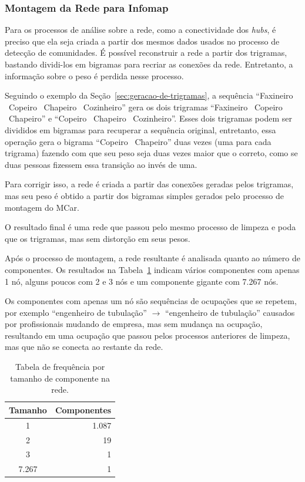 \documentclass[12pt,a4paper]{article}
\begin{document}
\subsubsection{Montagem da Rede para Infomap} \label{sec:montagem-da-rede}

Para os processos de análise sobre a rede, como a conectividade dos \textit{hubs}, é preciso que ela seja criada a partir dos mesmos dados usados no processo de detecção de comunidades. É possível reconstruir a rede a partir dos trigramas, bastando dividi-los em bigramas para recriar as conexões da rede. Entretanto, a informação sobre o peso é perdida nesse processo.

Seguindo o exemplo da Seção~\ref{sec:geracao-de-trigramas}, a sequência \enquote{Faxineiro \textrightarrow~Copeiro \textrightarrow~Chapeiro \textrightarrow~Cozinheiro} gera os dois trigramas \enquote{Faxineiro \textrightarrow~Copeiro \textrightarrow~Chapeiro} e \enquote{Copeiro \textrightarrow~Chapeiro \textrightarrow~Cozinheiro}. Esses dois trigramas podem ser divididos em bigramas para recuperar a sequência original, entretanto, essa operação gera o bigrama \enquote{Copeiro \textrightarrow~Chapeiro} duas vezes (uma para cada trigrama) fazendo com que seu peso seja duas vezes maior que o correto, como se duas pessoas fizessem essa transição ao invés de uma.

Para corrigir isso, a rede é criada a partir das conexões geradas pelos trigramas, mas seu peso é obtido a partir dos bigramas simples gerados pelo processo de montagem do MCar.

O resultado final é uma rede que passou pelo mesmo processo de limpeza e poda que os trigramas, mas sem distorção em seus pesos.

Após o processo de montagem, a rede resultante é analisada quanto ao número de componentes. Os resultados na Tabela~\ref{tab:componentes} indicam vários componentes com apenas 1 nó, alguns poucos com 2 e 3 nós e um componente gigante com 7.267 nós.

Os componentes com apenas um nó são sequências de ocupações que se repetem, por exemplo \enquote{engenheiro de tubulação} $\to$ \enquote{engenheiro de tubulação} causados por profissionais mudando de empresa, mas sem mudança na ocupação, resultando em uma ocupação que passou pelos processos anteriores de limpeza, mas que não se conecta ao restante da rede.

\begin{table}[ht]
    \centering
    \begin{tabular}{@{} c r @{}}
        \toprule
        Tamanho & Componentes \\
        \midrule
        1        &  1.087 \\
        2        &  19 \\
        3        &  1 \\
        7.267 &  1 \\
        \bottomrule
    \end{tabular}
    \caption{Tabela de frequência por tamanho de componente na rede.}
    \label{tab:componentes}
\end{table}
\end{document}

